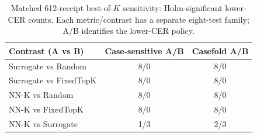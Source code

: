 \begin{table}[H]
\centering\small
\caption{Matched 612-receipt best-of-$K$ sensitivity: Holm-significant lower-CER counts. Each metric/contrast has a separate eight-test family; A/B identifies the lower-CER policy.}
\label{tab:sroie_casefold_counts}
\begin{tabular}{lcc}\toprule
Contrast (A vs B) & Case-sensitive A/B & Casefold A/B \\\midrule
Surrogate vs Random & 8/0 & 8/0 \\
Surrogate vs FixedTopK & 8/0 & 8/0 \\
NN-K vs Random & 8/0 & 8/0 \\
NN-K vs FixedTopK & 8/0 & 8/0 \\
NN-K vs Surrogate & 1/3 & 2/3 \\
\bottomrule\end{tabular}\end{table}

\begin{table}[H]
\centering\small
\caption{NN-K minus Surrogate on the same 612 receipts and folds (pp). CS: case-sensitive sensitivity; CF: primary casefold. CIs are per-comparison 95\% paired percentile intervals, not multiplicity-adjusted; $p_H$ uses each metric\textquotesingle s eight-test family. Nonzero rounded-zero endpoints retain their signs. Significance follows Wilcoxon--Holm, not mean-CI zero exclusion.}
\label{tab:sroie_casefold_nn}
\end{table}

